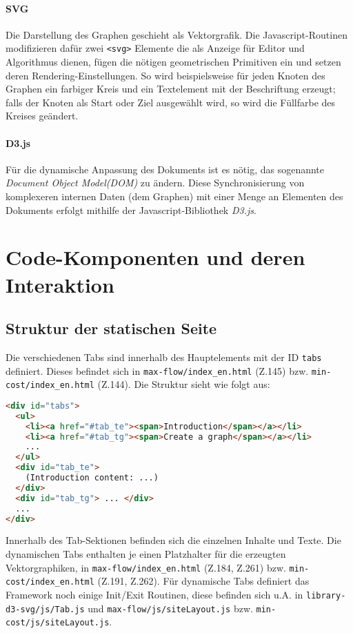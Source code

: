 \paragraph{SVG}

Die Darstellung des Graphen geschieht als Vektorgrafik. Die Javascript-Routinen modifizieren dafür zwei \texttt{<svg>} Elemente die als Anzeige für Editor und Algorithmus dienen, fügen die nötigen geometrischen Primitiven ein und setzen deren Rendering-Einstellungen. So wird beispielsweise für jeden Knoten des Graphen ein farbiger Kreis und ein Textelement mit der Beschriftung erzeugt; falls der Knoten als Start oder Ziel ausgewählt wird, so wird die Füllfarbe des Kreises geändert.

\paragraph{D3.js}

Für die dynamische Anpassung des Dokuments ist es nötig, das sogenannte \emph{Document Object Model(DOM)} zu ändern. Diese Synchronisierung von komplexeren internen Daten (dem Graphen) mit einer Menge an Elementen des Dokuments erfolgt mithilfe der Javascript-Bibliothek \emph{D3.js}\cite{d3js}.


\section{Code-Komponenten und deren Interaktion}

\subsection{Struktur der statischen Seite}

Die verschiedenen Tabs sind innerhalb des Hauptelements mit der ID \texttt{tabs} definiert. Dieses befindet sich in \texttt{max-flow/index\_en.html} (Z.145) bzw. \texttt{min-cost/index\_en.html} (Z.144). Die Struktur sieht wie folgt aus:

\begin{lstlisting}[caption=Tabstruktur,language=HTML]
<div id="tabs">
  <ul>
    <li><a href="#tab_te"><span>Introduction</span></a></li>
    <li><a href="#tab_tg"><span>Create a graph</span></a></li>
    ...
  </ul>
  <div id="tab_te"> 
    (Introduction content: ...)
  </div>
  <div id="tab_tg"> ... </div>
  ...
</div>
\end{lstlisting}

Innerhalb des Tab-Sektionen befinden sich die einzelnen Inhalte und Texte. Die dynamischen Tabs enthalten je einen Platzhalter für die erzeugten Vektorgraphiken, in \texttt{max-flow/index\_en.html} (Z.184, Z.261) bzw. \texttt{min-cost/index\_en.html} (Z.191, Z.262). Für dynamische Tabs definiert das Framework noch einige Init/Exit Routinen, diese befinden sich u.A. in \texttt{library-d3-svg/js/Tab.js} und \texttt{max-flow/js/siteLayout.js} bzw. \texttt{min-cost/js/siteLayout.js}.


